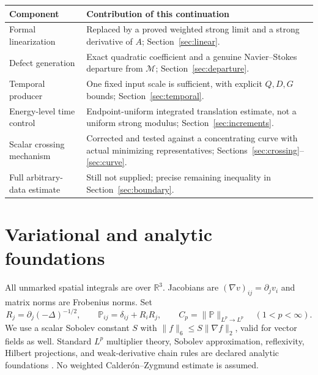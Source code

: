 \documentclass[11pt,a4paper]{article}
\theoremstyle{definition}\newtheorem{definition}[theorem]{Definition}
\theoremstyle{remark}\newtheorem{remark}[theorem]{Remark}
\newcommand{\R}{\mathbb R}
\newcommand{\M}{\mathcal M}
\newcommand{\PP}{\mathbb P}
\newcommand{\norm}[1]{\lVert #1\rVert}
\numberwithin{equation}{section}
\begin{document}
\begin{center}\begin{tabular}{@{}p{48mm}p{107mm}@{}}\toprule
Component & Contribution of this continuation\\\midrule
Formal linearization & Replaced by a proved weighted strong limit and a strong derivative of $A$; Section~\ref{sec:linear}.\\[2pt]
Defect generation & Exact quadratic coefficient and a genuine Navier--Stokes departure from $\M$; Section~\ref{sec:departure}.\\[2pt]
Temporal producer & One fixed input scale is sufficient, with explicit $Q,D,G$ bounds; Section~\ref{sec:temporal}.\\[2pt]
Energy-level time control & Endpoint-uniform integrated translation estimate, not a uniform strong modulus; Section~\ref{sec:increments}.\\[2pt]
Scalar crossing mechanism & Corrected and tested against a concentrating curve with actual minimizing representatives; Sections~\ref{sec:crossing}--\ref{sec:curve}.\\[2pt]
Full arbitrary-data estimate & Still not supplied; precise remaining inequality in Section~\ref{sec:boundary}.\\\bottomrule
\end{tabular}\end{center}

\section{Variational and analytic foundations}
\label{sec:foundations}
All unmarked spatial integrals are over $\R^3$. Jacobians are $(\nabla v)_{ij}=\partial_jv_i$ and matrix norms are Frobenius norms. Set
\[
 R_j=\partial_j(-\Delta)^{-1/2},\qquad
 \PP_{ij}=\delta_{ij}+R_iR_j,\qquad
 C_p=\norm\PP_{L^p\to L^p}\quad(1<p<\infty).
\]
We use a scalar Sobolev constant $S$ with $\norm f_6\le S\norm{\nabla f}_2$, valid for vector fields as well. Standard $L^p$ multiplier theory, Sobolev approximation, reflexivity, Hilbert projections, and weak-derivative chain rules are declared analytic foundations \cite{Stein}. No weighted Calder\'on--Zygmund estimate is assumed.
\end{document}
